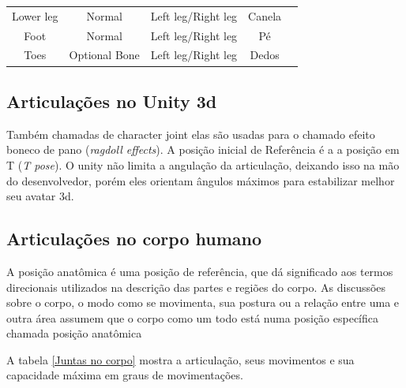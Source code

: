 \begin{table}[]
\begin{tabular}{|c|c|c|c|c}
Lower leg                    & Normal                       & Left leg/Right leg            & Canela                              &  \\ \cline{1-4}
Foot                         & Normal                       & Left leg/Right leg            & Pé                                  &  \\ \cline{1-4}
Toes                         & Optional Bone                & Left leg/Right leg            & Dedos                                  &  \\ \cline{1-4}
\end{tabular}
\end{table} 

\subsection{Articulações no Unity 3d}
\label{Sec:Articulacoes no Unity 3d}
  Também chamadas de character joint elas são usadas para o chamado efeito 
boneco de pano (\textit{ragdoll effects}). A posição inicial de Referência é a 
a posição em T (\textit{T pose}). O unity não limita a angulação da articulação, 
deixando isso na mão do desenvolvedor, porém eles orientam ângulos máximos 
para estabilizar melhor seu avatar 3d.\cite{unity3dManual}

\subsection{Articulações no corpo humano}
\label{Sec:Juntas no corpo humano}
 A posição anatômica é uma posição de referência, que dá significado aos termos
 direcionais utilizados na descrição das partes e regiões do corpo. As discussões
 sobre o corpo, o modo como se movimenta, sua postura ou a relação entre uma e 
outra área assumem que o corpo como um todo está numa posição específica chamada
 posição anatômica 

  A tabela \ref{Juntas no corpo} mostra a articulação, seus movimentos e sua capacidade máxima em
graus de movimentações.

